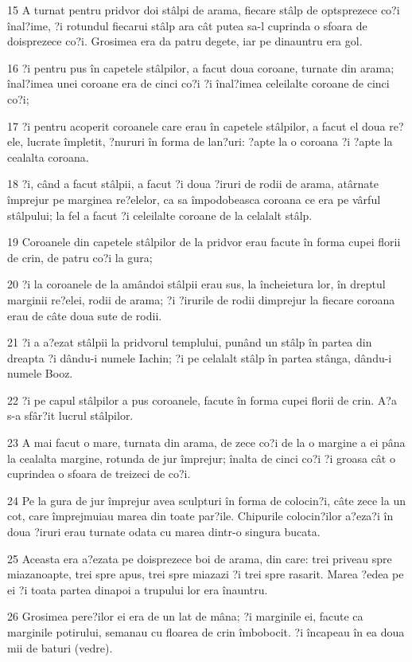 \par 15 A turnat pentru pridvor doi stâlpi de arama, fiecare stâlp de optsprezece co?i înal?ime, ?i rotundul fiecarui stâlp ara cât putea sa-l cuprinda o sfoara de doisprezece co?i. Grosimea era da patru degete, iar pe dinauntru era gol.
\par 16 ?i pentru pus în capetele stâlpilor, a facut doua coroane, turnate din arama; înal?imea unei coroane era de cinci co?i ?i înal?imea celeilalte coroane de cinci co?i;
\par 17 ?i pentru acoperit coroanele care erau în capetele stâlpilor, a facut el doua re?ele, lucrate împletit, ?nururi în forma de lan?uri: ?apte la o coroana ?i ?apte la cealalta coroana.
\par 18 ?i, când a facut stâlpii, a facut ?i doua ?iruri de rodii de arama, atârnate împrejur pe marginea re?elelor, ca sa împodobeasca coroana ce era pe vârful stâlpului; la fel a facut ?i celeilalte coroane de la celalalt stâlp.
\par 19 Coroanele din capetele stâlpilor de la pridvor erau facute în forma cupei florii de crin, de patru co?i la gura;
\par 20 ?i la coroanele de la amândoi stâlpii erau sus, la încheietura lor, în dreptul marginii re?elei, rodii de arama; ?i ?irurile de rodii dimprejur la fiecare coroana erau de câte doua sute de rodii.
\par 21 ?i a a?ezat stâlpii la pridvorul templului, punând un stâlp în partea din dreapta ?i dându-i numele Iachin; ?i pe celalalt stâlp în partea stânga, dându-i numele Booz.
\par 22 ?i pe capul stâlpilor a pus coroanele, facute în forma cupei florii de crin. A?a s-a sfâr?it lucrul stâlpilor.
\par 23 A mai facut o mare, turnata din arama, de zece co?i de la o margine a ei pâna la cealalta margine, rotunda de jur împrejur; înalta de cinci co?i ?i groasa cât o cuprindea o sfoara de treizeci de co?i.
\par 24 Pe la gura de jur împrejur avea sculpturi în forma de colocin?i, câte zece la un cot, care împrejmuiau marea din toate par?ile. Chipurile colocin?ilor a?eza?i în doua ?iruri erau turnate odata cu marea dintr-o singura bucata.
\par 25 Aceasta era a?ezata pe doisprezece boi de arama, din care: trei priveau spre miazanoapte, trei spre apus, trei spre miazazi ?i trei spre rasarit. Marea ?edea pe ei ?i toata partea dinapoi a trupului lor era înauntru.
\par 26 Grosimea pere?ilor ei era de un lat de mâna; ?i marginile ei, facute ca marginile potirului, semanau cu floarea de crin îmbobocit. ?i încapeau în ea doua mii de baturi (vedre).
